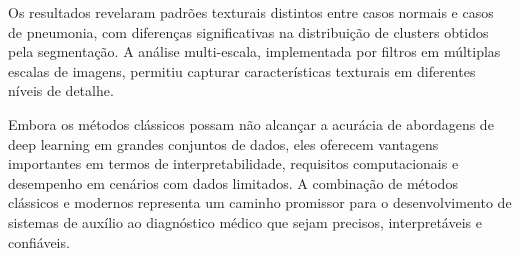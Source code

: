 \documentclass[sigconf,nonacm]{acmart}
\begin{document}
Os resultados revelaram padrões texturais distintos entre casos normais e casos de pneumonia, com diferenças significativas na distribuição de clusters obtidos pela segmentação. A análise multi-escala, implementada por filtros em múltiplas escalas de imagens, permitiu capturar características texturais em diferentes níveis de detalhe.

Embora os métodos clássicos possam não alcançar a acurácia de abordagens de deep learning em grandes conjuntos de dados, eles oferecem vantagens importantes em termos de interpretabilidade, requisitos computacionais e desempenho em cenários com dados limitados. A combinação de métodos clássicos e modernos representa um caminho promissor para o desenvolvimento de sistemas de auxílio ao diagnóstico médico que sejam precisos, interpretáveis e confiáveis.

\balance


\end{document}
